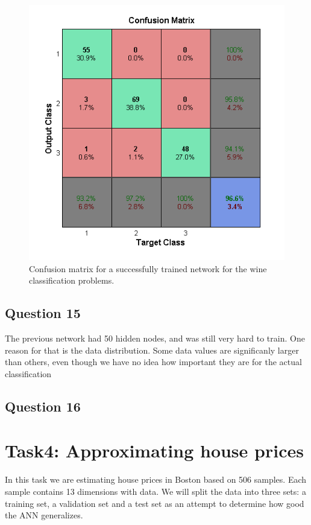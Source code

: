 \documentclass[a4paper]{article}
\begin{document}
\begin{figure}[h!] %
    \includegraphics[]{wine_classification.png}
    \caption{\label{fig:wine_classification}Confusion matrix for a successfully trained network for the wine classification problems.}
\end{figure}

\subsection*{Question 15}
The previous network had 50 hidden nodes, and was still very hard to train. One reason 
for that is the data distribution. Some data values are significanly larger than others,
even though we have no idea how important they are for the actual classification

\subsection*{Question 16}

\section{Task4: Approximating house prices}
In this task we are estimating house prices in Boston based on 506 samples. Each sample contains 13 dimensions with data.
We will split the data into three sets: a training set, a validation set and a test set as an attempt to determine how good the ANN generalizes.
\end{document}
